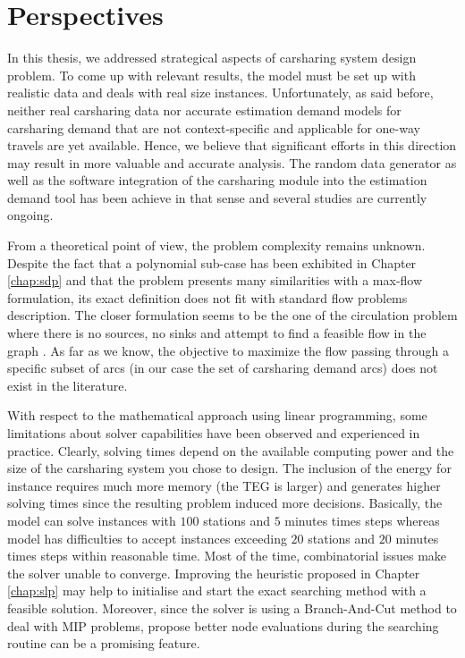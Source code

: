 \section{Perspectives}
In this thesis, we addressed strategical aspects of carsharing system design problem.
To come up with relevant results, the model must be set up with realistic data and deals with real size instances.
Unfortunately, as said before, neither real carsharing data nor accurate estimation demand models for carsharing demand that are not context-specific and applicable for one-way travels are yet available.
Hence, we believe that significant efforts in this direction may result in more valuable and accurate analysis.
The random data generator as well as the software integration of the carsharing module into the estimation demand tool has been achieve in that sense and several studies are currently ongoing.


\medskip
From a theoretical point of view, the {\SDP} problem complexity remains unknown.
Despite the fact that a polynomial sub-case has been exhibited in Chapter \ref{chap:sdp} and that the problem presents many similarities with a max-flow formulation, its exact definition does not fit with standard flow problems description.
The closer formulation seems to be the one of the circulation problem where there is no sources, no sinks and attempt to find a feasible flow in the graph \cite{ahuja_network_1993}.
As far as we know, the objective to maximize the flow passing through a specific subset of arcs (in our case the set of carsharing demand arcs) does not exist in the literature.


\medskip
With respect to the mathematical approach using linear programming, some limitations about solver capabilities have been observed and experienced in practice.
Clearly, solving times depend on the available computing power and the size of the carsharing system you chose to design.
The inclusion of the energy for instance requires much more memory (the TEG is larger) and generates higher solving times since the resulting problem induced more decisions.
Basically, the {\SDP} model can solve instances with $100$ stations and $5$ minutes times steps whereas {\ENERGY} model has difficulties to accept instances exceeding $20$ stations and $20$ minutes times steps within reasonable time.
Most of the time, combinatorial issues make the solver unable to converge.
Improving the heuristic proposed in Chapter \ref{chap:slp} may help to initialise and start the exact searching method with a feasible solution.
Moreover, since the solver is using a Branch-And-Cut method to deal with MIP problems, propose better node evaluations during the searching routine can be a promising feature.

